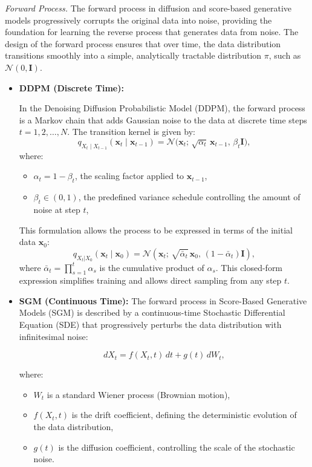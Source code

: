 \textit{Forward Process.} The forward process in diffusion and score-based generative models progressively corrupts the original data into noise, providing the foundation for learning the reverse process that generates data from noise. The design of the forward process ensures that over time, the data distribution transitions smoothly into a simple, analytically tractable distribution $\pi$, such as \( \mathcal{N}(0, \mathbf{I}) \).

\begin{itemize}
    \item \textbf{DDPM (Discrete Time):}
    
    In the Denoising Diffusion Probabilistic Model (DDPM), the forward process is a Markov chain that adds Gaussian noise to the data at discrete time steps \( t = 1, 2, \dots, N \). The transition kernel is given by:
    \[
    q_{X_t \mid X_{t-1}}(\mathbf{x}_t \mid \mathbf{x}_{t-1}) = \mathcal{N}\bigl(\mathbf{x}_t;\, \sqrt{\alpha_t} \, \mathbf{x}_{t-1},\, \beta_t \mathbf{I}\bigr),
    \]
    where:
    \begin{itemize}
        \item \( \alpha_t = 1 - \beta_t \), the scaling factor applied to \( \mathbf{x}_{t-1} \),
        \item \( \beta_t \in (0, 1) \), the predefined variance schedule controlling the amount of noise at step \( t \),
    \end{itemize}
    This formulation allows the process to be expressed in terms of the initial data \( \mathbf{x}_0 \):
    \[
    q_{X_t|X_0}(\mathbf{x}_t \mid \mathbf{x}_0) = \mathcal{N}\left(\mathbf{x}_t;\, \sqrt{\bar{\alpha}_t} \, \mathbf{x}_0,\, (1 - \bar{\alpha}_t) \mathbf{I}\right),
    \]
    where \( \bar{\alpha}_t = \prod_{s=1}^t \alpha_s \) is the cumulative product of \( \alpha_s \). This closed-form expression simplifies training and allows direct sampling from any step \( t \).

    \item \textbf{SGM (Continuous Time):} The forward process in Score-Based Generative Models (SGM) is described by a continuous-time Stochastic Differential Equation (SDE) that progressively perturbs the data distribution with infinitesimal noise:

\[
dX_t = f(X_t, t) \, dt + g(t) \, dW_t,
\]

where:
\begin{itemize}
    \item \( W_t \) is a standard Wiener process (Brownian motion),
    \item \( f(X_t, t) \) is the drift coefficient, defining the deterministic evolution of the data distribution,
    \item \( g(t) \) is the diffusion coefficient, controlling the scale of the stochastic noise.
\end{itemize}


\end{itemize}
